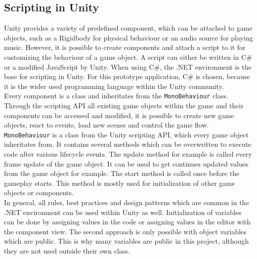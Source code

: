 \subsection{Scripting in Unity}
Unity provides a variety of predefined component, which can be attached to game objects, such as a Rigidbody for physical behaviour or an audio source for playing music. However, it is possible to create components and attach a script to it for customizing the behaviour of a game object. A script can either be written in C\# or a  modified JavaScript by Unity. When using C\#, the .NET environment is the base for scripting in Unity. For this prototype application, C\# is chosen, because it is the wider used programming language within the Unity community. \\
Every component is a class and inheritates from the \texttt{MonoBehaviour} class. Through the scripting API all existing game objects within the game and their components can be accessed and modified, it is possible to create new game objects, react to events, load new scenes and control the game flow.
\texttt{MonoBehaviour} is a class from the Unity scripting API, which every game object inheritates from. It contains several methods which can be overwritten to execute code after various lifecycle events. The update method for example is called every frame update of the game object. It can be used  to get continues updated values from the game object for example. The start method is called once before the gameplay starts. This method is mostly used for initialization of other game objects or components. \cite{unity.20192}\\
In general, all rules, best practices and design patterns which are common in the .NET environment can be used within Unity as well. Initialization of variables can be done by assigning values in the code or assigning values in the editor with the component view. The second approach is only possible with object variables which are public. This is why many variables are public in this project, although they are not used outside their own class.

